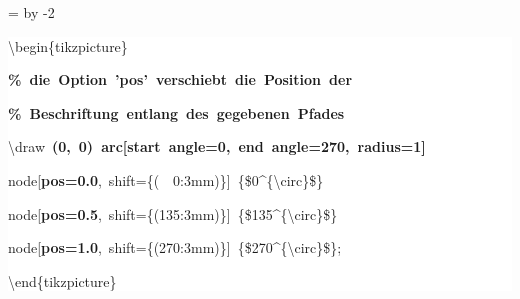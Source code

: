 \begingroup
\ttfamily
{}
=\textwidth
\advance{} by -2\fboxsep
\noindent
\colorbox{background}
{%
\parbox{\dimen255}
{%
\rule[-0.5ex]{0pt}{2.5ex}\hspace*{0.0em}\textbackslash{}begin\{tikzpicture\}\\
\rule[-0.5ex]{0pt}{2.5ex}\hspace*{1.0em}\textcolor{G}{\textbf{\%~die~Option~'pos'~verschiebt~die~Position~der}}\\
\rule[-0.5ex]{0pt}{2.5ex}\hspace*{1.0em}\textcolor{G}{\textbf{\%~Beschriftung~entlang~des~gegebenen~Pfades}}\\
\rule[-0.5ex]{0pt}{2.5ex}\hspace*{1.0em}\textbackslash{}draw~\textcolor{B}{\textbf{(0,~0)~arc[start~angle=0,~end~angle=270,~radius=1]}}\\
\rule[-0.5ex]{0pt}{2.5ex}\hspace*{4.0em}node[\textcolor{R}{\textbf{pos=0.0}},~shift=\{(~~0:3mm)\}]~\{\$0\^{}\{\textbackslash{}circ\}\$\}\\
\rule[-0.5ex]{0pt}{2.5ex}\hspace*{4.0em}node[\textcolor{R}{\textbf{pos=0.5}},~shift=\{(135:3mm)\}]~\{\$135\^{}\{\textbackslash{}circ\}\$\}\\
\rule[-0.5ex]{0pt}{2.5ex}\hspace*{4.0em}node[\textcolor{R}{\textbf{pos=1.0}},~shift=\{(270:3mm)\}]~\{\$270\^{}\{\textbackslash{}circ\}\$\};\\
\rule[-0.5ex]{0pt}{2.5ex}\hspace*{0.0em}\textbackslash{}end\{tikzpicture\}}%
}%
\endgroup
